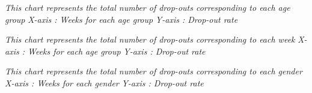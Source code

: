 \documentclass[a4paper,12pt,oneside]{sphinxmanual}
\begin{document}
\emph{This chart represents the total number of drop-outs corresponding to each age group}
\emph{X-axis : Weeks for each age group}
\emph{Y-axis : Drop-out rate}
\begin{figure}[htbp]
\centering

\end{figure}

\emph{This chart represents the total number of drop-outs corresponding to each week}
\emph{X-axis : Weeks for each age group}
\emph{Y-axis : Drop-out rate}
\begin{figure}[htbp]
\centering

\end{figure}

\emph{This chart represents the total number of drop-outs corresponding to each gender}
\emph{X-axis : Weeks for each gender}
\emph{Y-axis : Drop-out rate}
\begin{figure}[htbp]
\centering

\end{figure}
\end{document}
